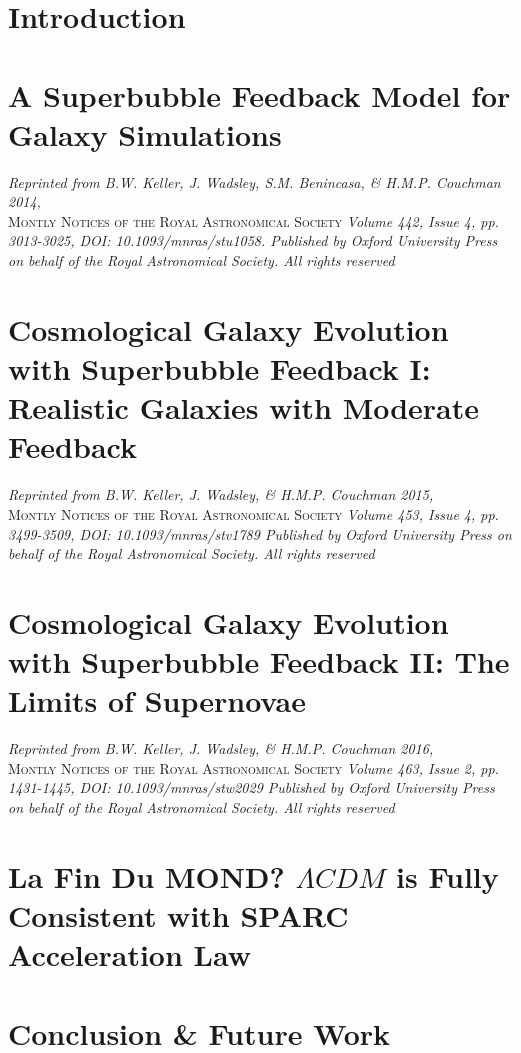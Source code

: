 \documentclass[letterpaper,12pt,twoside,openright]{report} %
\begin{document}

\chapter{Introduction}
\thispagestyle{fancy}


\chapter{A Superbubble Feedback Model for Galaxy Simulations}
\thispagestyle{fancy}
\textit{Reprinted from B.W. Keller, J. Wadsley, S.M. Benincasa, \& H.M.P.
Couchman 2014,} \\ \textsc{Montly Notices of the Royal Astronomical Society}
\textit{Volume 442, Issue 4, pp. 3013-3025, DOI: 10.1093/mnras/stu1058.
Published by Oxford University Press on behalf of the Royal Astronomical
Society.  All rights reserved}

\chapter{Cosmological Galaxy Evolution with Superbubble Feedback I: Realistic
Galaxies with Moderate Feedback}
\thispagestyle{fancy}
\textit{Reprinted from B.W. Keller, J. Wadsley, \& H.M.P.
Couchman 2015,} \\ \textsc{Montly Notices of the Royal Astronomical Society}
\textit{Volume 453, Issue 4, pp. 3499-3509, DOI: 10.1093/mnras/stv1789
Published by Oxford University Press on behalf of the Royal Astronomical
Society.  All rights reserved}

\chapter{Cosmological Galaxy Evolution with Superbubble Feedback II: The Limits
of Supernovae}
\thispagestyle{fancy}
\textit{Reprinted from B.W. Keller, J. Wadsley, \& H.M.P.
Couchman 2016,} \\ \textsc{Montly Notices of the Royal Astronomical Society}
\textit{Volume 463, Issue 2, pp. 1431-1445, DOI: 10.1093/mnras/stw2029
Published by Oxford University Press on behalf of the Royal Astronomical
Society.  All rights reserved}

\chapter{La Fin Du MOND? $\Lambda CDM$ is Fully Consistent with SPARC
Acceleration Law}
\thispagestyle{fancy}

\chapter{Conclusion \& Future Work}
\thispagestyle{fancy}

\end{document}
